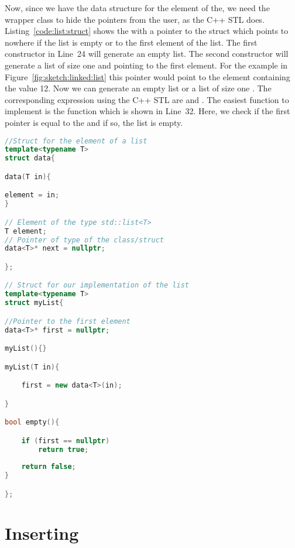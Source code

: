 Now, since we have the data structure for the element of the, we need the wrapper class to hide the pointers from the user, as the C++ STL does. Listing~\ref{code:list:struct} shows the  with a pointer to the struct  which points to nowhere  if the list is empty or to the first element of the list. The first constructor in Line~24 will generate an empty list. The second constructor will generate a list of size one and pointing to the first element. For the example in Figure~\ref{fig:sketch:linked:list} this pointer would point to the element containing the value 12. Now we can generate an empty list  or a list of size one . The corresponding expression using the C++ STL are  and . The easiest function to implement is the  function which is shown in Line~32. Here, we check if the first pointer is equal to the  and if so, the list is empty. 


\begin{lstlisting}[language=c++,caption={Example for a structure for a three dimensional vector.\label{code:list:struct}},float,floatplacement=tb]
//Struct for the element of a list
template<typename T>
struct data{

data(T in){

element = in;
}

// Element of the type std::list<T>
T element;
// Pointer of type of the class/struct
data<T>* next = nullptr;

};

// Struct for our implementation of the list
template<typename T>
struct myList{

//Pointer to the first element
data<T>* first = nullptr;

myList(){}

myList(T in){

	first = new data<T>(in);

}

bool empty(){

	if (first == nullptr)
		return true;
	
	return false;
}

};
\end{lstlisting}

\section*{Inserting}

